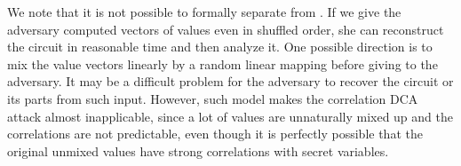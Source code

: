 We note that it is not possible to formally separate \VH{} from \SH{}. If we give the adversary computed vectors of values even in shuffled order, she can reconstruct the circuit in reasonable time and then analyze it. One possible direction is to mix the value vectors linearly by a random linear mapping before giving to the adversary. It may be a difficult problem for the adversary to recover the circuit or its parts from such input. However, such model makes the correlation DCA attack almost inapplicable, since a lot of values are unnaturally mixed up and the correlations are not predictable, even though it is perfectly possible that the original unmixed values have strong correlations with secret variables.
